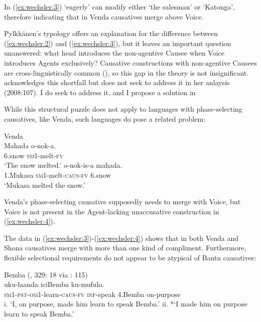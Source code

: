 \documentclass[output=paper,modfonts,nonflat,colorlinks,citecolor=brown]{langsci/langscibook}
\begin{document}
In (\ref{ex:wechsler:3}) ‘eagerly’ can modify either ‘the salesman’ or ‘Katonga’, therefore indicating that in Venda causatives merge above Voice.



Pylkkänen’s typology offers an explanation for the difference between (\ref{ex:wechsler:2}) and (\ref{ex:wechsler:3}), but it leaves an important question unanswered: what head introduces the non-agentive Causee when Voice introduces Agents exclusively? Causative constructions with non-agentive Causees are cross-linguistically common (\citealt{Kulikov2001,Kittilä2013}), so this gap in the theory is not insignificant. \citeauthor{Pylkkänen2008} acknowledges this shortfall but does not seek to address it in her anlaysis (2008:107). I do seek to address it, and I propose a solution in 



While this structural puzzle does not apply to languages with phase-selecting causatives, like Venda, such languages do pose a related problem:


\ea\label{ex:wechsler:4}
Venda \citet[2]{Pylkkänen2008}\\
\ea
\gll Mahada  {{o-nok-a}}. \\
6.snow  {\textsc{sm1}{}-melt-\textsc{fv} }\\
\glt `The snow melted.'
\ex
{}  {{o-nok-is-a} } {mahada}.\\
 {1.Mukasa}   {\textsc{sm1}{}-melt-\textsc{caus}{}-\textsc{fv} }  6.snow\\
\glt `Mukasa melted the snow.'
\z
\z

Venda’s phase-selecting causative supposedly needs to merge with Voice, but Voice is not present in the Agent-lacking unaccusative construction in (\ref{ex:wechsler:4}).

The data in (\ref{ex:wechsler:3})-(\ref{ex:wechsler:4}) shows that in both Venda and Shona causatives merge with more than one kind of compliment. Furthermore, flexible selectional requirements do not appear to be atypical of Bantu causatives:

\ea\label{ex:wechsler:5}
{Bemba (\citealt{Givón1969}, 329: 18 via \citealt{Pylkkänen2008}: 115)}\\
 {uku-laanda} {iciBemba} {ku-mufulo}.\\
\textsc{sm}1\textsc{-pst-om1}-learn-\textsc{caus-fv}  \textsc{inf-}speak  4.Bemba  on-purpose\\
\glt i. ‘I, on purpose, made him learn to speak Bemba.’
\glt ii. *‘I made him on purpose learn to speak Bemba.'
\z
\end{document}

